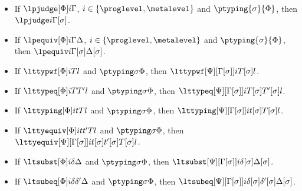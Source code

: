 \begin{lemma}$ $
  \begin{itemize}
  \item If $\lpjudge[\Phi] i \Gamma$, $i \in \{\proglevel, \metalevel\}$ and $\ptyping{\sigma}{\Phi}$, then $\lpjudge i {\Gamma[\sigma]}$.
  \item If $\lpequiv[\Phi] i \Gamma \Delta$, $i \in \{\proglevel, \metalevel\}$ and $\ptyping{\sigma}{\Phi}$, then $\lpequiv i {\Gamma[\sigma]}{\Delta[\sigma]}$.
  \item If $\lttypwf[\Phi]i T l$ and $\ptyping\sigma\Phi$, then
    $\lttypwf[\Psi][\Gamma[\sigma]] i{T[\sigma]} l$.
  \item If $\lttypeq[\Phi]i T{T'} l$ and $\ptyping\sigma\Phi$, then
    $\lttypeq[\Psi][\Gamma[\sigma]] i{T[\sigma]}{T'[\sigma]} l$.
  \item If $\lttyping[\Phi]i t T l$ and $\ptyping\sigma\Phi$, then
    $\lttyping[\Psi][\Gamma[\sigma]] i{t[\sigma]}{T[\sigma]} l$.
  \item If $\lttyequiv[\Phi]i t{t'} T l$ and $\ptyping\sigma\Phi$, then
    $\lttyequiv[\Psi][\Gamma[\sigma]] i{t[\sigma]}{t'[\sigma]}{T[\sigma]} l$.
  \item If $\ltsubst[\Phi] i{\delta}{\Delta}$ and $\ptyping\sigma\Phi$, then
    $\ltsubst[\Psi][\Gamma[\sigma]] i{\delta[\sigma]}{\Delta[\sigma]}$.
  \item If $\ltsubeq[\Phi] i{\delta}{\delta'}{\Delta}$ and $\ptyping\sigma\Phi$, then
    $\ltsubeq[\Psi][\Gamma[\sigma]] i{\delta[\sigma]}{\delta'[\sigma]}{\Delta[\sigma]}$.
  \end{itemize}
\end{lemma}

